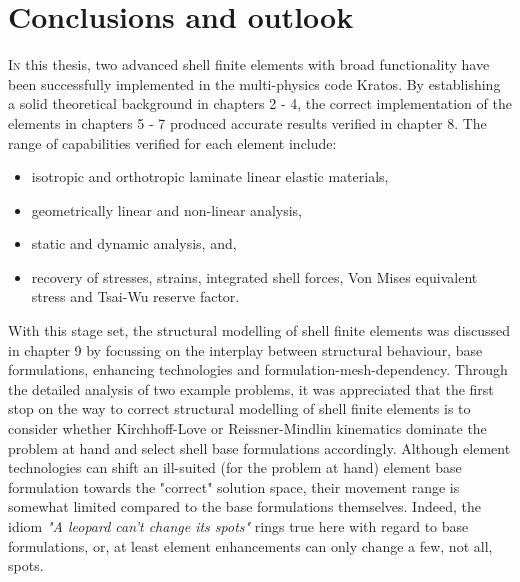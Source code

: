 
\chapter{Conclusions and outlook}
\label{chap:conclusions}
\renewcommand{\Thema}{Conclusion}

\lettrine[lines=2]{I}{n} this thesis, two advanced shell finite elements with broad functionality have been successfully implemented in the multi-physics code Kratos. By establishing a solid theoretical background in chapters 2 - 4, the correct implementation of the elements in chapters 5 - 7 produced accurate results verified in chapter 8. The range of  capabilities verified for each element include:
\begin{itemize}
	\item isotropic and orthotropic laminate linear elastic materials,
	\item geometrically linear and non-linear analysis,
	\item static and dynamic analysis, and,
	\item recovery of stresses, strains, integrated shell forces, Von Mises equivalent stress and Tsai-Wu reserve factor.
\end{itemize}

With this stage set, the structural modelling of shell finite elements was discussed in chapter 9 by focussing on the interplay between structural behaviour, base formulations, enhancing technologies and formulation-mesh-dependency. Through the detailed analysis of two example problems, it was appreciated that the first stop on the way to correct structural modelling of shell finite elements is to consider whether Kirchhoff-Love or Reissner-Mindlin kinematics dominate the problem at hand and select shell base formulations accordingly. Although element technologies can shift an ill-suited (for the problem at hand) element base formulation towards the "correct" solution space, their movement range is somewhat limited compared to the base formulations themselves. Indeed, the idiom \textit{"A leopard can't change its spots"} rings true here with regard to base formulations, or, at least element enhancements can only change a few, not all, spots. 

